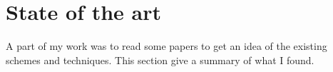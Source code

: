 \section{State of the art}
A part of my work was to read some papers to get an idea of the existing schemes and techniques. This section give a summary of what I found.\\






